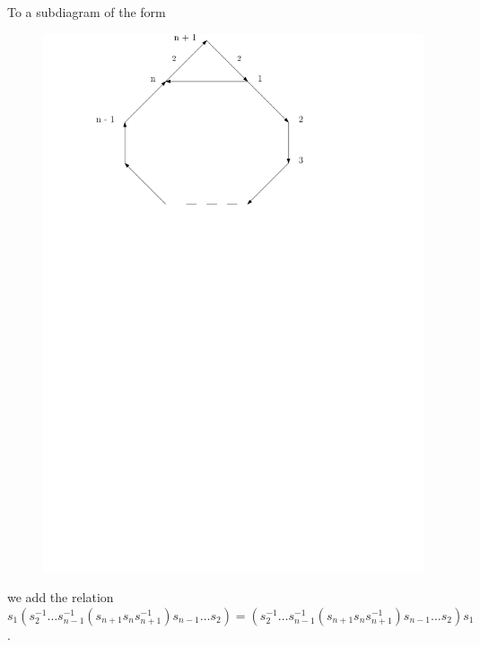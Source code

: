 \documentclass{beamer}
\begin{document}
\begin{frame}
To a subdiagram of the form
\begin{figure}
\includegraphics[scale = .50]{Diagram4.pdf}
\end{figure}
we add the relation $s_{1}(s_{2}^{-1} \dots s_{n-1}^{-1}(s_{n+1}s_{n}s_{n+1}^{-1})s_{n-1} \dots s_{2}) = (s_{2}^{-1} \dots s_{n-1}^{-1}(s_{n+1}s_{n}s_{n+1}^{-1})s_{n-1} \dots s_{2})s_{1}$.
\end{frame}
\end{document}
